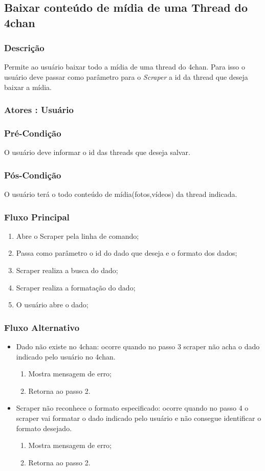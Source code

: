 \subsection{Baixar conteúdo de mídia de uma Thread do 4chan}
\subsubsection{Descrição}
Permite ao usuário baixar todo a mídia de uma thread do 4chan. Para isso o usuário deve passar como parâmetro para o \textit{Scraper} a id da thread que deseja baixar a mídia.
\subsubsection{Atores : Usuário}
\subsubsection{Pré-Condição}
O usuário deve informar o id das threads que deseja salvar.
\subsubsection{Pós-Condição}
O usuário terá o todo conteúdo de mídia(fotos,vídeos) da thread indicada.
\subsubsection{Fluxo Principal}
\begin{enumerate}
    \item Abre o Scraper pela linha de comando;
    \item Passa como parâmetro o id do dado que deseja e o formato dos dados;
    \item Scraper realiza a busca do dado;
    \item Scraper realiza a formatação do dado;
    \item O usuário abre o dado;
\end{enumerate}
\subsubsection{Fluxo Alternativo}
\begin{itemize}
    \item Dado não existe no 4chan: ocorre quando no passo 3 scraper não acha o dado indicado pelo usuário no 4chan.
    \begin{enumerate}
        \item Mostra mensagem de erro;
        \item Retorna ao passo 2.
    \end{enumerate}
    \item Scraper não reconhece o formato especificado: ocorre quando no passo 4 o scraper vai formatar o dado indicado pelo usuário e não consegue identificar o formato desejado.
    \begin{enumerate}
        \item Mostra mensagem de erro;
        \item Retorna ao passo 2.
    \end{enumerate}
\end{itemize}

